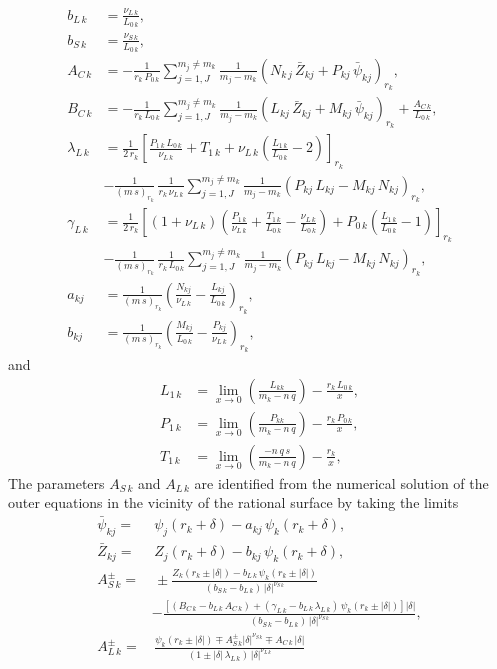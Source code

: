 \documentclass[12pt,prb,aps,notitlepage]{revtex4-1}
\begin{document}
\begin{align}
b_{L\,k} &= \frac{\nu_{L\,k}}{L_{0\,k}},\\[0.5ex]
b_{S\,k} &= \frac{\nu_{S\,k}}{L_{0\,k}},\\[0.5ex]
A_{C\,k} &= - \frac{1}{r_k\,P_{0\,k}}\sum_{j=1,J}^{m_j\neq m_k}\frac{1}{m_j-m_k}\left(N_{k\,j}\,\bar{Z}_{kj}+ P_{kj}\,\bar{\psi}_{kj}\right)_{r_k},\\[0.5ex]
B_{C\,k} &= - \frac{1}{r_k\,L_{0\,k}}\sum_{j=1,J}^{m_j\neq m_k}\frac{1}{m_j-m_k}\left(L_{kj}\,\bar{Z}_{kj}+ M_{kj}\,\bar{\psi}_{kj}\right)_{r_k}+\frac{A_{C\,k}}{L_{0\,k}},\\[0.5ex]
\lambda_{L\,k} &= \frac{1}{2\,r_k}\left[\frac{P_{1\,k}\,L_{0\,k}}{\nu_{L\,k}} + T_{1\,k} + \nu_{L\,k}\left(\frac{L_{1\,k}}{L_{0\,k}}-2\right)\right]_{r_k}\nonumber\\[0.5ex]&
-\frac{1}{(m\,s)_{r_k}}\,\frac{1}{r_k\,\nu_{L\,k}}\sum_{j=1,J}^{m_j\neq m_k}\frac{1}{m_j-m_k}\left(P_{kj}\,L_{kj}-M_{kj}\,N_{kj}\right)_{r_k},\\[0.5ex]
\gamma_{L\,k} &=\frac{1}{2\,r_k}\left[(1+\nu_{L\,k})\left(\frac{P_{1\,k}}{\nu_{L\,k}}+\frac{T_{1\,k}}{L_{0\,k}}-\frac{\nu_{L\,k}}{L_{0\,k}}\right)+
P_{0\,k}\left(\frac{L_{1\,k}}{L_{0\,k}}-1\right)\right]_{r_k}\nonumber\\[0.5ex]
&-\frac{1}{(m\,s)_{r_k}}\,\frac{1}{r_k\,L_{0\,k}}\sum_{j=1,J}^{m_j\neq m_k}\frac{1}{m_j-m_k}\left(P_{kj}\,L_{kj}-M_{kj}\,N_{kj}\right)_{r_k},\\[0.5ex]
a_{kj}&= \frac{1}{(m\,s)_{r_k}}\left(\frac{N_{kj}}{\nu_{L\,k}}-\frac{L_{kj}}{L_{0\,k}}\right)_{r_k},\\[0.5ex]
b_{kj}&= \frac{1}{(m\,s)_{r_k}}\left(\frac{M_{kj}}{L_{0\,k}}-\frac{P_{kj}}{\nu_{L\,k}}\right)_{r_k},
\end{align}
and
\begin{align}
L_{1\,k} &= \lim_{x\rightarrow 0}\left(\frac{L_{kk}}{m_k-n\,q}\right)-\frac{r_k\,L_{0\,k}}{x},\\[0.5ex]
P_{1\,k}&=  \lim_{x\rightarrow 0}\left(\frac{P_{kk}}{m_k-n\,q}\right) -\frac{r_k\,P_{0\,k}}{x},\\[0.5ex]
T_{1\,k} &= \lim_{x\rightarrow 0}\left(\frac{-n\,q\,s}{m_k-n\,q}\right)-\frac{r_k}{x},
\end{align}
The parameters $A_{S\,k}$ and $A_{L\,k}$ are identified from the numerical solution of the outer equations in the
vicinity of the  rational surface 
by taking the limits
\begin{align}
\bar{\psi}_{kj} =&\, \psi_{j}(r_k+\delta) - a_{kj}\,\psi_k(r_k+\delta),\\[0.5ex]
\bar{Z}_{kj}=&\, Z_{j}(r_k+\delta) - b_{kj}\,\psi_k(r_k+\delta),\\[0.5ex]
A_{S\,k}^\pm =&\, \pm\frac{Z_k(r_k\pm|\delta|)- b_{L\,k}\,\psi_k(r_k\pm|\delta|)}{(b_{S\,k}-b_{L\,k})\,|\delta|^{\nu_{S\,k}}}\nonumber\\[0.5ex]& -\frac{\left[(B_{C\,k}-b_{L\,k}\,A_{C\,k})+(\gamma_{L\,k}-b_{L\,k}\,\lambda_{L\,k})\,\psi_k(r_k\pm |\delta|)\right]|\delta|}{(b_{S\,k}-b_{L\,k})\,|\delta|^{\nu_{S\,k}}},\\[0.5ex]
A_{L\,k}^\pm =&\, \frac{\psi_k(r_k\pm|\delta|)\mp A_{S\,k}^\pm |\delta|^{\nu_{S\,k}}\mp A_{C\,k}\,|\delta|}{(1\pm |\delta|\,\lambda_{L\,k})\,|\delta|^{\nu_{L\,k}}}
\end{align}
\end{document}
